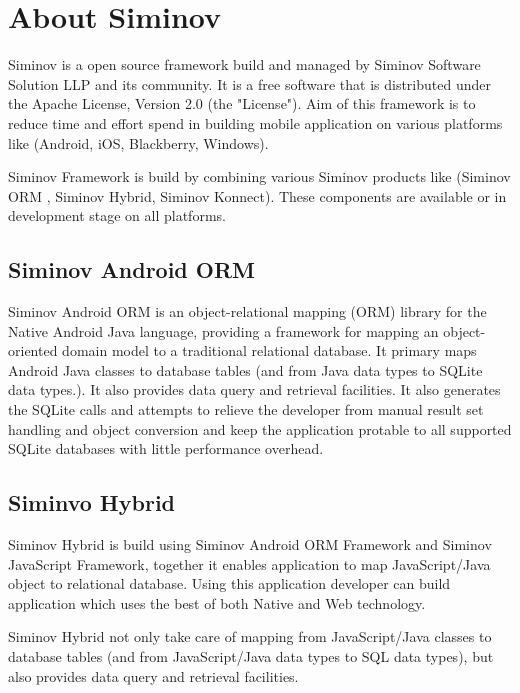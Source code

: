 \newpage
\chapter {\Large{About Siminov}}

Siminov is a open source framework build and managed by Siminov Software Solution LLP and its community. It is a free software that is distributed under the Apache License, Version 2.0 (the "License"). Aim of this framework is to reduce time and effort spend in building mobile application on various platforms like (Android, iOS, Blackberry, Windows).

Siminov Framework is build by combining various Siminov products like (Siminov ORM , Siminov Hybrid, Siminov Konnect). These components are available or in development stage on all platforms.

\section{Siminov Android ORM}
Siminov Android ORM is an object-relational mapping (ORM) library for the Native Android Java language, providing a framework for mapping an object-oriented domain model to a traditional relational database. It primary maps Android Java classes to database tables (and from Java data types to SQLite data types.). It also provides data query and retrieval facilities. It also generates the SQLite calls and attempts to relieve the developer from manual result set handling and object conversion and keep the application protable to all supported SQLite databases with little performance overhead.


\section{Siminvo Hybrid}
Siminov Hybrid is build using Siminov Android ORM Framework and Siminov JavaScript Framework, together it enables application to map JavaScript/Java object to relational database. Using this application developer can build application which uses the best of both Native and Web technology.

Siminov Hybrid not only take care of mapping from JavaScript/Java  classes to database tables (and from JavaScript/Java data types to SQL data types), but also provides data query and retrieval facilities.


